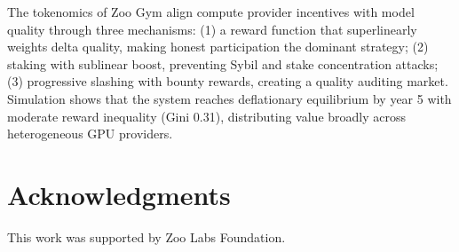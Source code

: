 \documentclass[11pt,letterpaper]{article}
\begin{document}
The tokenomics of Zoo Gym align compute provider incentives with model quality through three mechanisms: (1) a reward function that superlinearly weights delta quality, making honest participation the dominant strategy; (2) staking with sublinear boost, preventing Sybil and stake concentration attacks; (3) progressive slashing with bounty rewards, creating a quality auditing market.  Simulation shows that the system reaches deflationary equilibrium by year 5 with moderate reward inequality (Gini 0.31), distributing value broadly across heterogeneous GPU providers.

\section*{Acknowledgments}

This work was supported by Zoo Labs Foundation.
\end{document}
